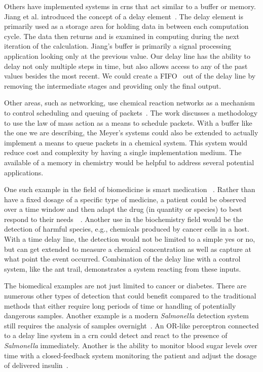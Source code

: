 Others have implemented systems in \glspl{crn} that act similar to a buffer or memory. Jiang et al. introduced the concept of a delay element~\cite{Jiang2013-gq}. The delay element is primarily used as a storage area for holding data in between each computation cycle. The data then returns and is examined in computing during the next iteration of the calculation. Jiang's buffer is primarily a signal processing application looking only at the previous value. Our delay line has the ability to delay not only multiple steps in time, but also allows access to any of the past values besides the most recent. We could create a FIFO~\cite{Kanopoulos1986-of} out of the delay line by removing the intermediate stages and providing only the final output.

Other areas, such as networking, use chemical reaction networks as a mechanism to control scheduling and queuing of packets~\cite{Meyer2011-xn}. The work discusses a methodology to use the law of mass action as a means to schedule packets. With a buffer like the one we are describing, the Meyer's systems could also be extended to actually implement a means to queue packets in a chemical system. This system would reduce cost and complexity by having a single implementation medium. The available of a memory in chemistry would be helpful to address several potential applications.

One such example in the field of biomedicine is smart medication~\cite{Neat1988-zv} \cite{Abbod2002-pt} \cite{Halamek2010-lk} \cite{Wang2010-se} \cite{Zhou2012-jf}. Rather than have a fixed dosage of a specific type of medicine, a patient could be observed over a time window and then adapt the drug (in quantity or species) to best respond to their needs~\cite{Mailloux2014-ux}~\cite{Mailloux2014-de}. Another use in the biochemistry field would be the detection of harmful species, e.g., chemicals produced by cancer cells in a host. With a time delay line, the detection would not be limited to a simple yes or no, but can get extended to measure a chemical concentration as well as capture at what point the event occurred. Combination of the delay line with a control system, like the ant trail, demonstrates a system reacting from these inputs.

The biomedical examples are not just limited to cancer or diabetes. There are numerous other types of detection that could benefit compared to the traditional methods that either require long periods of time or handling of potentially dangerous samples. Another example is a modern \textit{Salmonella} detection system still requires the analysis of samples overnight~\cite{Alvarez2004-ix}. An OR-like perceptron connected to a delay line system in a \gls{crn} could detect and react to the presence of \textit{Salmonella} immediately. Another is the ability to monitor blood sugar levels over time with a closed-feedback system monitoring the patient and adjust the dosage of delivered insulin~\cite{Wang2010-se}.


